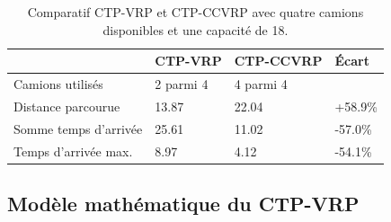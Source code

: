 \documentclass[5p,authoryear]{elsarticle}
\begin{document}
\begin{table}[p] \centering \begin{tabular}{@{\small}llll@{}} \toprule %
 & {\footnotesize CTP-VRP} &  {\footnotesize CTP-CCVRP} & Écart \\ \midrule
Camions utilisés & 2 parmi 4 & 4 parmi 4 &  \\
Distance parcourue & 13.87 & 22.04 & +58.9\% \\
Somme temps d'arrivée & 25.61 & 11.02 & -57.0\% \\
Temps d'arrivée max. & 8.97 & 4.12 & -54.1\% \\ \bottomrule
\end{tabular} \caption{Comparatif CTP-VRP et CTP-CCVRP avec quatre camions disponibles et une capacité de 18.} \label{table_quatre_camions}
\end{table}
%

\subsection{Modèle mathématique du CTP-VRP}\label{modele_ctpvrp}
\end{document}
